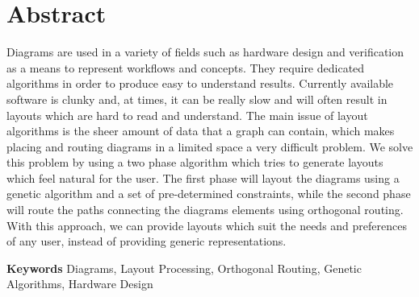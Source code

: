 \chapter*{Abstract}

\vspace{\baselineskip}

Diagrams are used in a variety of fields such as hardware design and verification as a means to represent workflows and concepts. They require dedicated algorithms in order to produce easy to understand results. 
Currently available software is clunky and, at times, it can be really slow and will often result in layouts which are hard to read and understand. The main issue of layout algorithms is the sheer amount 
of data that a graph can contain, which makes placing and routing diagrams in a limited space a very difficult problem. We solve this problem by using a two phase algorithm which tries 
to generate layouts which feel natural for the user. The first phase will layout the diagrams using a genetic algorithm and a set of pre-determined constraints, while the second 
phase will route the paths connecting the diagrams elements using orthogonal routing. With this approach, we can provide layouts which suit the needs and preferences of any user, instead of providing 
generic representations.

\vspace{\baselineskip}
\textbf{Keywords} Diagrams, Layout Processing, Orthogonal Routing, Genetic Algorithms, Hardware Design
